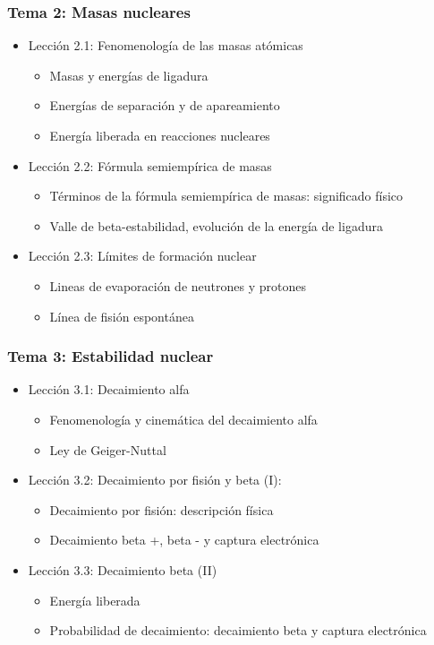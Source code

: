 \documentclass[a4paper,12pt,twoside]{article}
\begin{document}
\subsubsection*{Tema 2: Masas nucleares}
\begin{itemize}
\item Lección 2.1: Fenomenología de las masas atómicas
\begin{itemize}
\item Masas y energías de ligadura
\item Energías de separación y de apareamiento
\item Energía liberada en reacciones nucleares
\end{itemize}
\item Lección 2.2: Fórmula semiempírica de masas
\begin{itemize}
\item Términos de la fórmula semiempírica de masas: significado físico
\item Valle de beta-estabilidad, evolución de la energía de ligadura
\end{itemize}
\item Lección 2.3: Límites de formación nuclear
\begin{itemize}
\item Lineas de evaporación de neutrones y protones
\item Línea de fisión espontánea
\end{itemize}
\end{itemize}

\subsubsection*{Tema 3: Estabilidad nuclear}
\begin{itemize}
\item Lección 3.1: Decaimiento alfa
\begin{itemize}
\item Fenomenología y cinemática del decaimiento alfa
\item Ley de Geiger-Nuttal
\end{itemize}
\item Lección 3.2: Decaimiento por fisión y beta (I):
\begin{itemize}
\item Decaimiento por fisión: descripción física
\item Decaimiento beta +, beta - y captura electrónica
\end{itemize}
\item Lección 3.3: Decaimiento beta (II)
\begin{itemize}
\item Energía liberada
\item Probabilidad de decaimiento: decaimiento beta y captura electrónica
\end{itemize}
\end{itemize}
\end{document}
